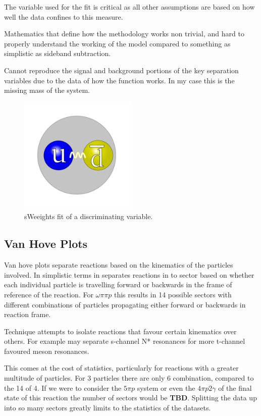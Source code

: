 The variable used for the fit is critical as all other assumptions are based on how well the data confines to this measure.

Mathematics that define how the methodology works non trivial, and hard to properly understand the working of the model compared to something as simplistic as sideband subtraction.

Cannot reproduce the signal and background portions of the key separation variables due to the data of how the function works. In my case this is the missing mass of the system.

\begin{figure}
	\centering
	\includegraphics[width=0.5\textwidth]{ImgChap1/meson2}
	\caption{sWeeights fit of a discriminating variable.}		
	\label{sWeights}
\end{figure}

\subsection{Van Hove Plots}

Van hove plots separate reactions based on the kinematics of the particles involved. In simplistic terms in separates reactions in to sector based on whether each individual particle is travelling forward or backwards in the frame of reference of the reaction. For $\omega\pi\pi p$ this results in 14 possible sectors with different combinations of particles propagating either forward or backwards in reaction frame.

Technique attempts to isolate reactions that favour certain kinematics over others. For example may separate s-channel N* resonances for more t-channel favoured meson resonances.

This comes at the cost of statistics, particularly for reactions with a greater multitude of particles. For 3 particles there are only 6 combination, compared to the 14 of 4. If we were to consider the $5\pi p$ system  or even the $4\pi p2\gamma $ of the final state of this reaction the number of sectors would be \textbf{TBD}. Splitting the data up into so many sectors greatly limits to the statistics of the datasets.

